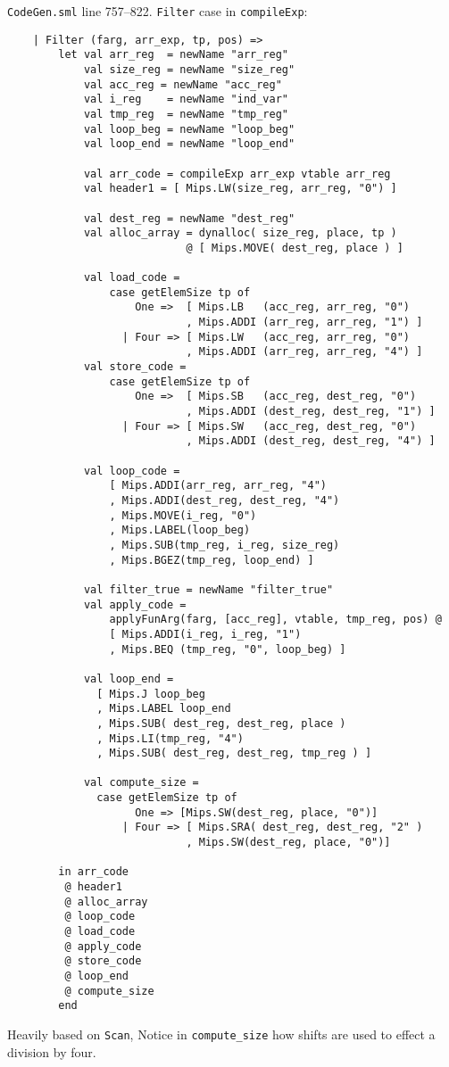 \documentclass[12pt, a4paper]{article}
\begin{document}
\texttt{CodeGen.sml} line 757--822. \texttt{Filter} case in \texttt{compileExp}:
\begin{lstlisting}
    | Filter (farg, arr_exp, tp, pos) =>
        let val arr_reg  = newName "arr_reg"   
            val size_reg = newName "size_reg"  
            val acc_reg = newName "acc_reg"
            val i_reg    = newName "ind_var"   
            val tmp_reg  = newName "tmp_reg"   
            val loop_beg = newName "loop_beg"
            val loop_end = newName "loop_end"

            val arr_code = compileExp arr_exp vtable arr_reg
            val header1 = [ Mips.LW(size_reg, arr_reg, "0") ]

            val dest_reg = newName "dest_reg"
            val alloc_array = dynalloc( size_reg, place, tp )
                            @ [ Mips.MOVE( dest_reg, place ) ]

            val load_code =
                case getElemSize tp of
                    One =>  [ Mips.LB   (acc_reg, arr_reg, "0")
                            , Mips.ADDI (arr_reg, arr_reg, "1") ]
                  | Four => [ Mips.LW   (acc_reg, arr_reg, "0")
                            , Mips.ADDI (arr_reg, arr_reg, "4") ]
            val store_code =
                case getElemSize tp of
                    One =>  [ Mips.SB   (acc_reg, dest_reg, "0")
                            , Mips.ADDI (dest_reg, dest_reg, "1") ]
                  | Four => [ Mips.SW   (acc_reg, dest_reg, "0")
                            , Mips.ADDI (dest_reg, dest_reg, "4") ]
            
            val loop_code =
                [ Mips.ADDI(arr_reg, arr_reg, "4")
                , Mips.ADDI(dest_reg, dest_reg, "4")
                , Mips.MOVE(i_reg, "0")
                , Mips.LABEL(loop_beg)
                , Mips.SUB(tmp_reg, i_reg, size_reg)
                , Mips.BGEZ(tmp_reg, loop_end) ]
            
            val filter_true = newName "filter_true"
            val apply_code =
                applyFunArg(farg, [acc_reg], vtable, tmp_reg, pos) @
                [ Mips.ADDI(i_reg, i_reg, "1")
                , Mips.BEQ (tmp_reg, "0", loop_beg) ]

            val loop_end =
              [ Mips.J loop_beg
              , Mips.LABEL loop_end
              , Mips.SUB( dest_reg, dest_reg, place )
              , Mips.LI(tmp_reg, "4")
              , Mips.SUB( dest_reg, dest_reg, tmp_reg ) ]

            val compute_size =
              case getElemSize tp of
                    One => [Mips.SW(dest_reg, place, "0")]
                  | Four => [ Mips.SRA( dest_reg, dest_reg, "2" )
                            , Mips.SW(dest_reg, place, "0")]

        in arr_code
         @ header1
         @ alloc_array
         @ loop_code
         @ load_code
         @ apply_code
         @ store_code
         @ loop_end
         @ compute_size
        end
\end{lstlisting}
Heavily based on \texttt{Scan}, Notice in \verb+compute_size+ how shifts are used 
to effect a division by four.
\end{document}
